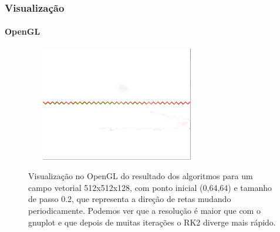 \documentclass[brazil, 10pt]{beamer}
\begin{document}
\begin{frame}
  \frametitle{Visualização}
  \framesubtitle{OpenGL}
  
    \begin{figure}
    \begin{center}
      \includegraphics[width=80mm, height=50mm]{img/opengl-lines.png}
      \label{fig:2}
      \caption{Visualização no OpenGL do resultado dos algoritmos para um campo vetorial 512x512x128, com ponto inicial (0,64,64) e tamanho de passo 0.2, que representa a direção de retas mudando periodicamente. Podemos ver que a resolução é maior que com o gnuplot e que depois de muitas iterações o RK2 diverge mais rápido.}
    \end{center}
  \end{figure}
\end{frame}
\end{document}
